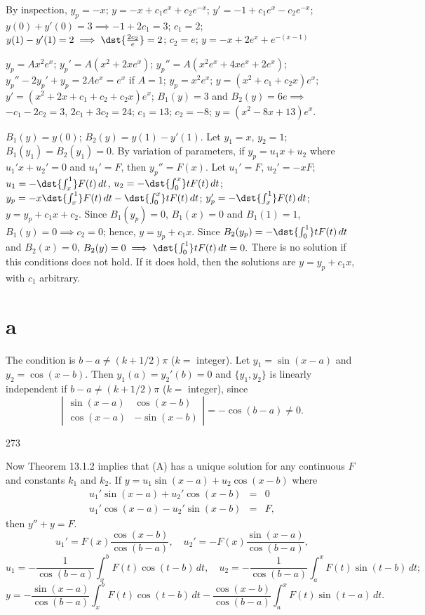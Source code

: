 \documentclass[dvips]{book}
\renewcommand{\exer}[1]{\par\medskip\;\noindent{\color{red}\bf #1.}}
\numberwithin{example}{section}
\numberwithin{equation}{section}
\numberwithin{theorem}{section}
\numberwithin{table}{section}
\numberwithin{figure}{section}
\begin{document}
\exer{13.1.4}
By inspection, $y_{p}=-x$; $y=-x+c_{1}e^{x}+c_{2}e^{-x}$;
$y'=-1+c_{1}e^{x}-c_{2}e^{-x}$;
 $y(0)+y'(0)=3 \implies -1+2c_{1}=3$; $c_{1}=2$;
$y(1)-y'(1)=2\implies\dst{\frac{2c_{2}}{e}}=2$; $c_{2}=e$;
$y=-x+2e^{x}+e^{-(x-1)}$


\exer{13.1.6}
$y_{p}=Ax^{2}e^{x}$; $y_{p}'=A(x^{2}+2x e^{x})$;
$y_{p}''=A(x^{2} e^{x}+4x e^{x}+2 e^{x})$;
\noindent
$y_{p}''-2y_{p}'+y_{p}=2A e^{x}= e^{x}$ if $A=1$;
$y_{p}=x^{2} e^{x}$;
$y=(x^{2}+c_{1}+c_{2}x) e^{x}$;
$y'=(x^{2}+2x+c_{1}+c_{2}+c_{2}x) e^{x}$;
$B_{1}(y)=3$ and $B_{2}(y)=6e\implies$ $-c_{1}-2c_{2}=3$,
$2c_{1}+3c_{2}=24$; $c_{1}=13$; $c_{2}=-8$;
$y=(x^{2}-8x+13)e^{x}$.


\exer{13.1.8}
$B_{1}(y)=y(0)$; $B_{2}(y)=y(1)-y'(1)$. Let $y_{1}=x$, $y_{2}=1$;
$B_{1}(y_{1})=B_{2}(y_{1})=0$. By variation of parameters, if
$y_{p}=u_{1}x+u_{2}$ where $u_{1}'x+u_{2}'=0$
and $u_{1}'=F$, then $y_{p}''=F(x)$. Let $u_{1}'=F$,
$u_{2}'=-xF$; $u_{1}=-\dst{\int_{x}^{1}}F(t)\,dt$,
$u_{2}=-\dst{\int_{0}^{x}}tF(t)\,dt$;
$y_{p}=-x\dst{\int_{x}^{1}}F(t)\,dt-\dst{\int_{0}^{x}}tF(t)\,dt$;
$y_{p}'=-\dst{\int_{x}^{1}}F(t)\,dt$;
$y=y_{p}+c_{1}x+c_{2}$. Since
$B_{1}(y_{p})=0$, $B_{1}(x)=0$ and $B_{1}(1)=1$, $B_{1}(y)=0\implies
c_{2}=0$; hence, $y=y_{p}+c_{1}x$. Since
$B_{2}(y_{p})=-\dst{\int_{0}^{1}}tF(t)\,dt$ and $B_{2}(x)=0$,
$B_{2}(y)=0\implies \dst{\int_{0}^{1}}tF(t)\,dt=0.$
There is no solution if this conditions does not hold.
If it does hold, then the solutions are $y=y_{p}+c_{1}x$, with   $c_{1}$
arbitrary.


\exer{13.1.10} \part{a}
The condition is  $b-a\ne (k+1/2)\pi$ ($k=$ integer).
Let $y_{1}=\sin(x-a)$ and $y_{2}=\cos(x-b)$. Then $y_{1}(a)=y_{2}'(b)=0$
and
$\{y_{1},y_{2}\}$ is linearly independent if $b-a\ne(k+1/2)\pi$
($k=$ integer), since
 $$
\left|\begin{array}{crccccc}
\sin(x-a)&\cos(x-b)\\\cos(x-a)&-\sin(x-b)
\end{array}\right|=-\cos(b-a)\ne0.
$$
\enlargethispage{1in}
\bigskip

\centerline{273}




\newpage
\noindent
Now Theorem 13.1.2  implies that (A) has a unique solution for any
continuous
$F$ and constants $k_{1}$ and $k_{2}$.
If $y=u_{1}\sin(x-a)+u_{2}\cos(x-b)$ where
\begin{eqnarray*}
u_{1}'\sin(x-a)+u_{2}'\cos(x-b)&=&0 \\
u_{1}'\cos(x-a)-u_{2}'\sin(x-b)&=&F,
\end{eqnarray*}
then $y''+y=F$.
$$
u_{1}'=F(x)\frac{\cos(x-b)}{\cos(b-a)}, \quad
u_{2}'= -F(x)\frac{\sin(x-a)}{\cos(b-a)},
$$
$$
u_{1}=-\frac{1}{\cos(b-a)}\int_{x}^{b}F(t)\cos(t-b)\,dt,\quad
u_{2}=-\frac{1}{\cos(b-a)}\int_{a}^{x}F(t)\sin(t-b)\,dt;
$$
$$
y=-\frac{\sin(x-a)}{\cos(b-a)}\int_{x}^{b}F(t)\cos(t-b)\,dt
-\frac{\cos(x-b)}{\cos(b-a)}\int_{a}^{x}F(t)\sin(t-a)\,dt.
$$
\end{document}
